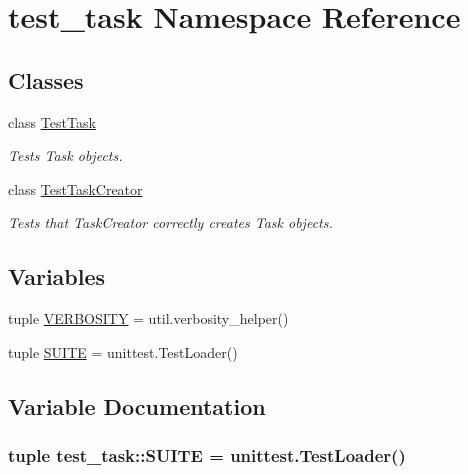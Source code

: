 \hypertarget{namespacetest__task}{
\section{test\-\_\-task \-Namespace \-Reference}
\label{namespacetest__task}
}
\subsection*{\-Classes}
\begin{DoxyCompactItemize}
\item 
class \hyperlink{classtest__task_1_1TestTask}{\-Test\-Task}
\begin{DoxyCompactList}\small\item\em \-Tests \-Task objects. \end{DoxyCompactList}\item 
class \hyperlink{classtest__task_1_1TestTaskCreator}{\-Test\-Task\-Creator}
\begin{DoxyCompactList}\small\item\em \-Tests that \-Task\-Creator correctly creates \-Task objects. \end{DoxyCompactList}\end{DoxyCompactItemize}
\subsection*{\-Variables}
\begin{DoxyCompactItemize}
\item 
tuple \hyperlink{namespacetest__task_a3620273808c2b578016e9b302ad3a301}{\-V\-E\-R\-B\-O\-S\-I\-T\-Y} = util.\-verbosity\-\_\-helper()
\item 
tuple \hyperlink{namespacetest__task_a16e721045f39f61475b0682975eb8dbe}{\-S\-U\-I\-T\-E} = unittest.\-Test\-Loader()
\end{DoxyCompactItemize}


\subsection{\-Variable \-Documentation}
\hypertarget{namespacetest__task_a16e721045f39f61475b0682975eb8dbe}{
\subsubsection[{\-S\-U\-I\-T\-E}]{\setlength{\rightskip}{0pt plus 5cm}tuple {\bf test\-\_\-task\-::\-S\-U\-I\-T\-E} = unittest.\-Test\-Loader()}}
\label{namespacetest__task_a16e721045f39f61475b0682975eb8dbe}


